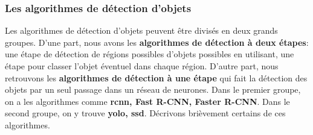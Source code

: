         \subsubsection{Les algorithmes de détection d'objets}
        Les algorithmes de détection d’objets peuvent être divisés en deux grands groupes. D’une part, nous avons les \textbf{algorithmes de détection à deux étapes}: une étape de détection de régions possibles d’objets possibles en utilisant, une étape pour classer l’objet éventuel dans chaque région. D’autre part, nous retrouvons les \textbf{algorithmes de détection à une étape} qui fait la détection des objets par un seul passage dans un réseau de neurones. Dans le premier groupe, on a les algorithmes comme \textbf{\acrshort{rcnn}, Fast R-CNN, Faster R-CNN}. Dans le second groupe, on y trouve \textbf{\acrshort{yolo}, \acrshort{ssd}}. Décrivons brièvement certains de ces algorithmes.
